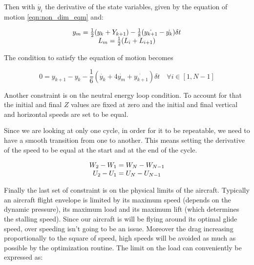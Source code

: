     Then with $\dot{y_i}$ the derivative of the state variables, given by the equation of motion \ref{eqn:non_dim_eqm} and:

    \begin{equation}
      \begin{array}[c]{c}
	y_m= \frac{1}{2}(y_k + Y_{k+1}) - \frac{1}{8}(\dot{y_{k+1}} - \dot{y_k})\delta t \\
	L_m=\frac{1}{2}(L_i + L_{i+1})
      \end{array}
      \label{eqn:simpson_middle}
    \end{equation}

    The condition to satisfy the equation of motion becomes

    \begin{equation}
      0=y_{k+1} - y_k - \frac{1}{6}( \dot{y_k} + 4 \dot{y_m} + \dot{y_{k+1}})\delta t \quad \forall i \in [1,N-1]
      \label{eqn:simpson}
    \end{equation}

    \par Another constraint is on the neutral energy loop condition.
    To account for that the initial and final $Z$ values are fixed at zero and the initial and final vertical and horizontal speeds are set to be equal.

    \par Since we are looking at only one cycle, in order for it to be repeatable, we need to have a smooth transition from one to another.
    This  means setting the derivative of the speed to be equal at the start and at the end of the cycle.

    \begin{equation}
      \begin{array}[c]{c}
	W_2 - W_1 = W_N - W_{N-1} \\
	U_2 - U_1 = U_N - U_{N-1} 
      \end{array}
      \label{eqn:derivative_constraint}
    \end{equation}

    \par Finally the last set of constraint is on the physical limits of the aircraft.
    Typically an aircraft flight envelope is limited by its maximum speed (depends on the dynamic pressure), its maximum load and its maximum lift (which determines the stalling speed).
    Since our aircraft is will be flying around its optimal glide speed, over speeding isn't going to be an issue.
    Moreover the drag increasing proportionally to the square of speed, high speeds will be avoided as much as possible by the optimization routine.
    The limit on the load can conveniently be expressed as:

